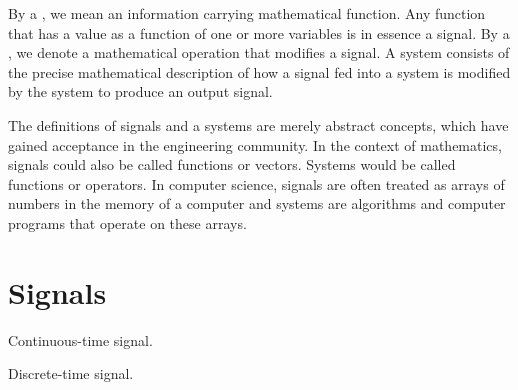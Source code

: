 %
%
 By
a \emph{}, we mean an information carrying
mathematical function. Any function that has a value as a function of
one or more variables is in essence a signal. By
a \emph{}, we denote a mathematical operation
that modifies a signal. A system consists of the precise mathematical
description of how a signal fed into a system is modified by the
system to produce an output signal.

The definitions of signals and a systems are merely abstract concepts,
which have gained acceptance in the engineering community. In the
context of mathematics, signals could also be called functions or
vectors. Systems would be called functions or operators. In computer
science, signals are often treated as arrays of numbers in the memory
of a computer and systems are algorithms and computer programs that
operate on these arrays.

\section{Signals}

\begin{marginfigure}%
\begin{center}
\end{center}
\caption{Continuous-time signal.}
\label{fig:ctfig}
\end{marginfigure}

\begin{marginfigure}%
\begin{center}
\end{center}
\caption{Discrete-time signal.}
\label{fig:dtfig}
\end{marginfigure}


